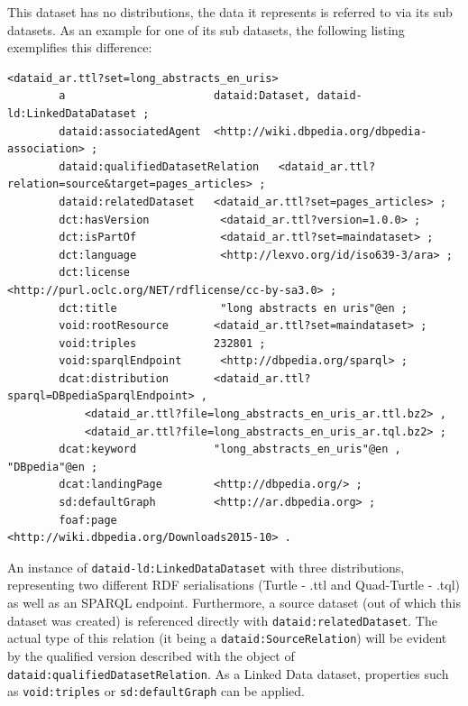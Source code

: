 \documentclass[a4paper,english,twoside,BCOR1.5cm,headsepline,DIV12,appendixprefix,final,12pt]{scrbook}
\newcommand{\prop}[1]{{{\texttt{#1}}}}
\begin{document}
This dataset has no distributions, the data it represents is referred to via its sub datasets. As an example for one of its sub datasets, the following listing exemplifies this difference:
\\
\begin{lstlisting}[language=ttl, captionpos=b,caption=A Dataset,label=lst:coresuperset,linewidth=\columnwidth,breaklines=true]
<dataid_ar.ttl?set=long_abstracts_en_uris>
        a                       dataid:Dataset, dataid-ld:LinkedDataDataset ;
        dataid:associatedAgent  <http://wiki.dbpedia.org/dbpedia-association> ;
        dataid:qualifiedDatasetRelation   <dataid_ar.ttl?relation=source&target=pages_articles> ;                 
        dataid:relatedDataset   <dataid_ar.ttl?set=pages_articles> ;
        dct:hasVersion           <dataid_ar.ttl?version=1.0.0> ;
        dct:isPartOf             <dataid_ar.ttl?set=maindataset> ;                                                 
        dct:language             <http://lexvo.org/id/iso639-3/ara> ;
        dct:license              <http://purl.oclc.org/NET/rdflicense/cc-by-sa3.0> ;
        dct:title                "long abstracts en uris"@en ;
        void:rootResource       <dataid_ar.ttl?set=maindataset> ;
        void:triples            232801 ;                                                                          
        void:sparqlEndpoint      <http://dbpedia.org/sparql> ;                                                    
        dcat:distribution       <dataid_ar.ttl?sparql=DBpediaSparqlEndpoint> ,                                    
            <dataid_ar.ttl?file=long_abstracts_en_uris_ar.ttl.bz2> ,
            <dataid_ar.ttl?file=long_abstracts_en_uris_ar.tql.bz2> ;
        dcat:keyword            "long_abstracts_en_uris"@en , "DBpedia"@en ;
        dcat:landingPage        <http://dbpedia.org/> ;
        sd:defaultGraph         <http://ar.dbpedia.org> ;                                                         
        foaf:page               <http://wiki.dbpedia.org/Downloads2015-10> . 
\end{lstlisting}

An instance of \prop{dataid-ld:LinkedDataDataset} with three distributions, representing two different RDF serialisations (Turtle - .ttl and Quad-Turtle - .tql) as well as an SPARQL endpoint. Furthermore, a source dataset (out of which this dataset was created) is referenced directly with \prop{dataid:relatedDataset}. The actual type of this relation (it being a \prop{dataid:SourceRelation}) will be evident by the qualified version described with the object of \prop{dataid:qualifiedDatasetRelation}. As a Linked Data dataset, properties such as \prop{void:triples} or \prop{sd:defaultGraph} can be applied.
 
\end{document}
